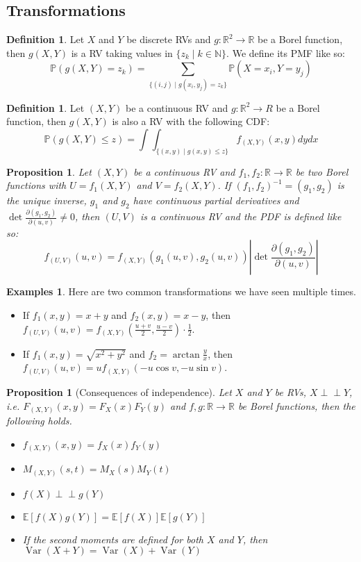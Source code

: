\documentclass[paper=a4, fontsize=12pt]{scrartcl} %
\newcommand{\bra}[1]{\left(#1\right)}
\newtheorem{prop}[thm]{Proposition}
\theoremstyle{definition}
\newtheorem{defn}[thm]{Definition}
\newtheorem{exmps}[thm]{Examples}
\theoremstyle{remark}
\newcommand{\R}{\mathbb{R}}
\newcommand{\N}{\mathbb{N}}
\newcommand{\E}{\mathbb{E}}
\newcommand{\Perp}{\perp\!\!\!\perp}
\renewcommand{\P}{\mathbb{P}}
\DeclareMathOperator{\vari}{Var}
\numberwithin{equation}{section} %
\numberwithin{figure}{section} %
\numberwithin{table}{section} %
\begin{document}
\subsection{Transformations}
\begin{defn}
	Let $X$ and $Y$ be discrete RVs and $g: \R^2 \rightarrow \R$ be a Borel function, then $g(X,Y)$ is a RV taking values in $\{z_k \mid k \in \N\}$. We define its PMF like so:
	\[ \P(g(X,Y) = z_k) = \sum_{\{(i,j) \mid g(x_i,y_j) = z_k\}}\P(X = x_i, Y = y_j) \]
\end{defn}
\begin{defn}
	Let $(X,Y)$ be a continuous RV and $g: \R^2 \rightarrow R$ be a Borel function, then $g(X,Y)$ is also a RV with the following CDF:
	\[ \P(g(X,Y) \leq z) = \int\int_{\{(x,y) \mid g(x,y) \leq z\}}f_{(X,Y)}(x,y)dydx \]
\end{defn}
\begin{prop}
	Let $(X,Y)$ be a continuous RV and $f_1, f_2: \R \rightarrow \R$ be two Borel functions with $U = f_1(X,Y)$ and $V = f_2(X,Y)$. If $(f_1,f_2)^{-1} = (g_1,g_2)$ is the unique inverse, $g_1$ and $g_2$ have continuous partial derivatives and $\det \frac{\partial(g_1, g_2)}{\partial(u,v)} \neq 0$, then $(U,V)$ is a continuous RV and the PDF is defined like so:
	\[f_{(U,V)}(u,v) = f_{(X,Y)}(g_1(u,v),g_2(u,v))\left|\det \frac{\partial(g_1, g_2)}{\partial(u,v)} \right|\] 
\end{prop}
\begin{exmps}
	Here are two common transformations we have seen multiple times.
	\begin{itemize}
		\item If $f_1(x,y)=x+y$ and $f_2(x,y) = x-y$, then $f_{(U,V)}(u,v) =f_{(X,Y)}\bra{\frac{u+v}{2}, \frac{u-v}{2}}\cdot \frac{1}{2}$.
		\item If $f_1(x,y) = \sqrt{x^2+y^2}$ and $f_2 = \arctan\frac{y}{x}$, then $f_{(U,V)}(u,v) =uf_{(X,Y)}\bra{-u\cos v, -u \sin v}$.
	\end{itemize}
\end{exmps}
\begin{prop}[Consequences of independence]
	Let $X$ and $Y$ be RVs, $X \Perp Y$, i.e. $F_{(X,Y)}(x,y) = F_X(x)F_Y(y)$ and $f,g : \R\rightarrow\R$ be Borel functions, then the following holds.
	\begin{itemize}
		\item $f_{(X,Y)}(x,y) = f_X(x)f_Y(y)$
		\item $M_{(X,Y)}(s,t) = M_X(s)M_Y(t)$
		\item $f(X) \Perp g(Y)$
		\item $\E[f(X)g(Y)] = \E[f(X)] \E[g(Y)]$
		\item If the second moments are defined for both $X$ and $Y$, then $\vari(X+Y) = \vari(X) + \vari(Y)$
	\end{itemize}
\end{prop}
\end{document}

